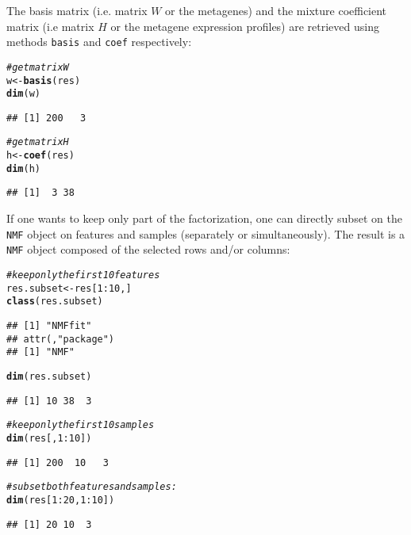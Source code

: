 \documentclass[a4paper]{article}\usepackage[]{graphicx}\usepackage[]{color}
\makeatletter
\newcommand{\hlnum}[1]{\textcolor[rgb]{0.686,0.059,0.569}{#1}}%
\newcommand{\hlcom}[1]{\textcolor[rgb]{0.678,0.584,0.686}{\textit{#1}}}%
\newcommand{\hlopt}[1]{\textcolor[rgb]{0,0,0}{#1}}%
\newcommand{\hlstd}[1]{\textcolor[rgb]{0.345,0.345,0.345}{#1}}%
\newcommand{\hlkwb}[1]{\textcolor[rgb]{0.69,0.353,0.396}{#1}}%
\newcommand{\hlkwd}[1]{\textcolor[rgb]{0.737,0.353,0.396}{\textbf{#1}}}%
\newenvironment{kframe}{%
 \def\at@end@of@kframe{}%
 \ifinner\ifhmode%
  \def\at@end@of@kframe{\end{minipage}}%
  \begin{minipage}{\columnwidth}%
 \fi\fi%
 \def\FrameCommand##1{\hskip\@totalleftmargin \hskip-\fboxsep
 \colorbox{shadecolor}{##1}\hskip-\fboxsep
     \hskip-\linewidth \hskip-\@totalleftmargin \hskip\columnwidth}%
 \MakeFramed {\advance\hsize-\width
   \@totalleftmargin\z@ \linewidth\hsize
   \@setminipage}}%
 {\par\unskip\endMakeFramed%
 \at@end@of@kframe}
\newenvironment{knitrout}{}{} %
\let\code=\texttt
\makeatother
\begin{document}
The basis matrix (i.e. matrix $W$ or the metagenes) and the mixture coefficient matrix (i.e matrix $H$ or the metagene expression profiles) are retrieved using methods \code{basis} and \code{coef} respectively:

\begin{knitrout}
\color{fgcolor}\begin{kframe}
\begin{alltt}
\hlcom{# get matrix W}
\hlstd{w} \hlkwb{<-} \hlkwd{basis}\hlstd{(res)}
\hlkwd{dim}\hlstd{(w)}
\end{alltt}
\begin{verbatim}
## [1] 200   3
\end{verbatim}
\begin{alltt}
\hlcom{# get matrix H}
\hlstd{h} \hlkwb{<-} \hlkwd{coef}\hlstd{(res)}
\hlkwd{dim}\hlstd{(h)}
\end{alltt}
\begin{verbatim}
## [1]  3 38
\end{verbatim}
\end{kframe}
\end{knitrout}



If one wants to keep only part of the factorization, one can directly subset on the \code{NMF} object on features and samples (separately or simultaneously).
The result is a \code{NMF} object composed of the selected rows and/or columns:
\begin{knitrout}
\color{fgcolor}\begin{kframe}
\begin{alltt}
\hlcom{# keep only the first 10 features}
\hlstd{res.subset} \hlkwb{<-} \hlstd{res[}\hlnum{1}\hlopt{:}\hlnum{10}\hlstd{, ]}
\hlkwd{class}\hlstd{(res.subset)}
\end{alltt}
\begin{verbatim}
## [1] "NMFfit"
## attr(,"package")
## [1] "NMF"
\end{verbatim}
\begin{alltt}
\hlkwd{dim}\hlstd{(res.subset)}
\end{alltt}
\begin{verbatim}
## [1] 10 38  3
\end{verbatim}
\begin{alltt}
\hlcom{# keep only the first 10 samples}
\hlkwd{dim}\hlstd{(res[,} \hlnum{1}\hlopt{:}\hlnum{10}\hlstd{])}
\end{alltt}
\begin{verbatim}
## [1] 200  10   3
\end{verbatim}
\begin{alltt}
\hlcom{# subset both features and samples:}
\hlkwd{dim}\hlstd{(res[}\hlnum{1}\hlopt{:}\hlnum{20}\hlstd{,} \hlnum{1}\hlopt{:}\hlnum{10}\hlstd{])}
\end{alltt}
\begin{verbatim}
## [1] 20 10  3
\end{verbatim}
\end{kframe}
\end{knitrout}
\end{document}
